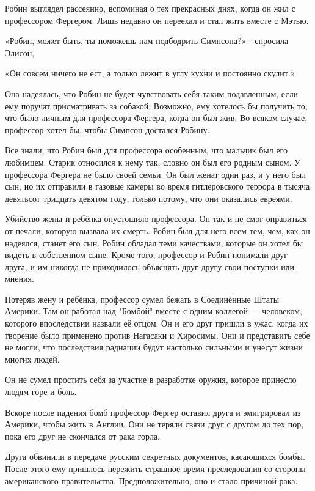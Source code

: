 \documentclass[a5paper, 9pt,
final, openany, twoside=true]{memoir}
\begin{document}
Робин выглядел рассеянно, вспоминая о тех прекрасных днях, когда он жил с профессором Фергером. Лишь недавно он переехал и стал жить вместе с Мэтью.\bigskip

«Робин, может быть, ты поможешь нам подбодрить Симпсона?» - спросила Элисон,

«Он совсем ничего не ест, а только лежит в углу кухни и постоянно скулит.»

Она надеялась, что Робин не будет чувствовать себя таким подавленным, если ему поручат присматривать за собакой. Возможно, ему хотелось бы получить то, что было личным для профессора Фергера, когда он был жив. Во всяком случае, профессор хотел бы, чтобы Симпсон достался Робину.

Все знали, что Робин был для профессора особенным, что мальчик был его любимцем. Старик относился к нему так, словно он был его родным сыном. У профессора Фергера не было своей семьи. Он был женат один раз, и у него был сын, но их отправили в газовые камеры во время гитлеровского террора в тысяча девятьсот тридцать девятом году, только потому, что они оказались евреями.

Убийство жены и ребёнка опустошило профессора. Он так и не смог оправиться от печали, которую вызвала их смерть. Робин был для него всем тем, чем, как он надеялся, станет его сын. Робин обладал теми качествами, которые он хотел бы видеть в собственном сыне. Кроме того, профессор и Робин понимали друг друга, и им никогда не приходилось объяснять друг другу свои поступки или мнения.

Потеряв жену и ребёнка, профессор сумел бежать в Соединённые Штаты Америки. Там он работал над "Бомбой" вместе с одним коллегой — человеком, которого впоследствии назвали её отцом. Он и его друг пришли в ужас, когда их творение было применено против Нагасаки и Хиросимы. Они и представить себе не могли, что последствия радиации будут настолько сильными и унесут жизни многих людей.

Он не сумел простить себя за участие в разработке оружия, которое принесло людям горе и боль.

Вскоре после падения бомб профессор Фергер оставил друга и эмигрировал из Америки, чтобы жить в Англии. Они не теряли связи друг с другом до тех пор, пока его друг не скончался от рака горла.

Друга обвинили в передаче русским секретных документов, касающихся бомбы. После этого ему пришлось пережить страшное время преследования со стороны американского правительства. Предположительно, оно и стало причиной рака.
\end{document}
